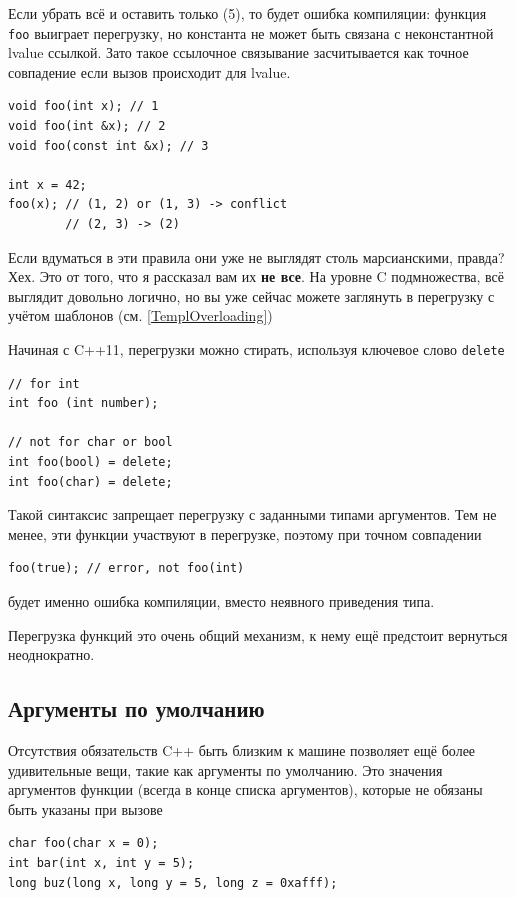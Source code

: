 \documentclass[a4paper,12pt,oneside]{book}
\begin{document}
Если убрать всё и оставить только (5), то будет ошибка компиляции: функция \lstinline!foo! выиграет перегрузку, но константа не может быть связана с неконстантной lvalue ссылкой. Зато такое ссылочное связывание засчитывается как точное совпадение если вызов происходит для lvalue.

\begin{lstlisting}
void foo(int x); // 1
void foo(int &x); // 2
void foo(const int &x); // 3

int x = 42;
foo(x); // (1, 2) or (1, 3) -> conflict 
        // (2, 3) -> (2) 
\end{lstlisting}

Если вдуматься в эти правила они уже не выглядят столь марсианскими, правда? Хех. Это от того, что я рассказал вам их \textbf{не все}. На уровне C подмножества, всё выглядит довольно логично, но вы уже сейчас можете заглянуть в перегрузку с учётом шаблонов (см. \ref{TemplOverloading})

Начиная с C++11, перегрузки можно стирать, используя ключевое слово \lstinline!delete!

\begin{lstlisting}
// for int
int foo (int number);

// not for char or bool
int foo(bool) = delete;
int foo(char) = delete;
\end{lstlisting}

Такой синтаксис запрещает перегрузку с заданными типами аргументов. Тем не менее, эти функции участвуют в перегрузке, поэтому при точном совпадении

\begin{lstlisting}
foo(true); // error, not foo(int)
\end{lstlisting}

будет именно ошибка компиляции, вместо неявного приведения типа.

Перегрузка функций это очень общий механизм, к нему ещё предстоит вернуться неоднократно.

\subsection{Аргументы по умолчанию}\label{subsub:defaultagrs}

Отсутствия обязательств C++ быть близким к машине позволяет ещё более удивительные вещи, такие как аргументы по умолчанию. Это значения аргументов функции (всегда в конце списка аргументов), которые не обязаны быть указаны при вызове

\begin{lstlisting}
char foo(char x = 0);
int bar(int x, int y = 5);
long buz(long x, long y = 5, long z = 0xafff);
\end{lstlisting}
\end{document}
